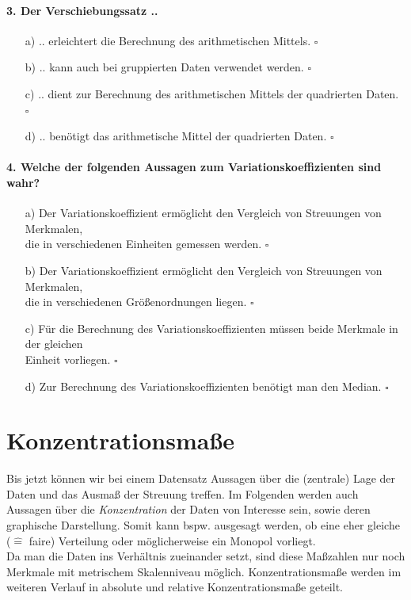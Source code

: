 \documentclass[a4paper]{article}
\begin{document}
\paragraph{3. Der Verschiebungssatz ..}

\begin{itemize}
    \item[a)] .. erleichtert die Berechnung des arithmetischen Mittels. \hfill $\square$
    \item[b)] .. kann auch bei gruppierten Daten verwendet werden. \hfill $\square$
    \item[c)] .. dient zur Berechnung des arithmetischen Mittels der quadrierten Daten. \hfill $\square$
    \item[d)] .. benötigt das arithmetische Mittel der quadrierten Daten. \hfill $\square$
\end{itemize}

\paragraph{4. Welche der folgenden Aussagen zum Variationskoeffizienten sind wahr?}

\begin{itemize}
    \item[a)] Der Variationskoeffizient ermöglicht den Vergleich von Streuungen von Merkmalen,\\die in verschiedenen Einheiten gemessen werden. \hfill $\square$
    \item[b)] Der Variationskoeffizient ermöglicht den Vergleich von Streuungen von Merkmalen,\\die in verschiedenen Größenordnungen liegen. \hfill $\square$
    \item[c)] Für die Berechnung des Variationskoeffizienten müssen beide Merkmale in der gleichen\\Einheit vorliegen. \hfill $\square$
    \item[d)] Zur Berechnung des Variationskoeffizienten benötigt man den Median. \hfill $\square$
\end{itemize}


\newpage


\section{Konzentrationsmaße}\label{sec:konz}
Bis jetzt können wir bei einem Datensatz Aussagen über die (zentrale) Lage der Daten und das Ausmaß der Streuung treffen. Im Folgenden werden auch Aussagen über die \textit{Konzentration} der Daten von Interesse sein, sowie deren graphische Darstellung. Somit kann bspw. ausgesagt werden, ob eine eher gleiche ($\widehat =$ faire) Verteilung oder möglicherweise ein Monopol vorliegt.\\
Da man die Daten ins Verhältnis zueinander setzt, sind diese Maßzahlen nur noch Merkmale mit  metrischem Skalenniveau möglich. Konzentrationsmaße werden im weiteren Verlauf in absolute und relative Konzentrationsmaße geteilt.
\end{document}
